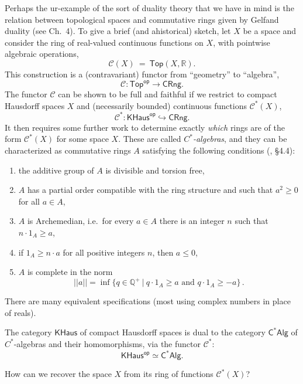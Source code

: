 \documentclass[graybox]{svmult}
\begin{document}
Perhaps the ur-example of the sort of duality theory that we have in mind is the relation between topological spaces and commutative rings given by Gelfand duality (see \cite{J} Ch.~4).  To give a brief (and ahistorical) sketch, let $X$ be a  space and consider the ring of real-valued continuous functions on $X$, with pointwise algebraic operations,
\[
 \mathcal{C}(X)\ =\ \mathsf{Top}(X, \mathbb{R}).
 \]
 This construction is a (contravariant) functor from ``geometry'' to ``algebra'',
 \[
 \mathcal{C} : \mathsf{Top}^\mathsf{op} \to \mathsf{CRng}.
 \]
%
The functor $ \mathcal{C}$ can be shown  to be full and faithful if we restrict to compact Hausdorff spaces $X$ and (necessarily bounded) continuous functions  $\mathcal{C}^*(X)$,
 \[
 \mathcal{C}^* : \mathsf{KHaus}^\mathsf{op} \hookrightarrow \mathsf{CRng}.
 \]
It then requires some further work to determine exactly \emph{which} rings are of the form $\mathcal{C}^*(X)$ for some space $X$.   These are called \emph{$C^*$-algebras}, and they can be characterized as commutative rings $A$ satisfying the following conditions (\cite{J}, \S4.4):
\begin{enumerate}
\item the additive group of $A$ is divisible and torsion free,
\item $A$ has a partial order compatible with the ring structure and such that $a^2 \geq 0$ for all $a\in A$,
\item $A$ is Archemedian, i.e.\ for every  $a\in A$ there is an integer $n$ such that $n\cdot 1_A \geq a$,
\item if $1_A\geq n\cdot a$ for all positive integers $n$, then $a\leq 0$,
\item $A$ is complete in the norm $$||a|| = \inf\{ q\in \mathbb{Q}^+\ |\ q\cdot 1_A \geq a\text{ and } q\cdot 1_A \geq -a\}\,.$$
\end{enumerate}
There are many equivalent specifications (most using complex numbers in place of reals).

 \begin{theorem}
 The category $\mathsf{KHaus}$ of compact Hausdorff spaces is dual to the category $\mathsf{C^*Alg}$ of $C^*$-algebras and their homomorphisms, via the functor $\mathcal{C}^*$:
 \[
 \mathsf{KHaus}^\mathsf{op} \simeq \mathsf{C^*Alg}.
 \]
 \end{theorem}

How can we recover the space $X$ from its ring of functions $\mathcal{C}^*(X)$?
\end{document}
